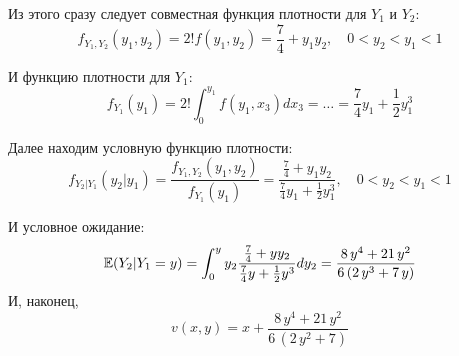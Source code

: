 \begin{enumerate}
\begin{enumerate}
Из этого сразу следует совместная функция плотности для $ Y_{1} $ и $ Y_{2} $:
\begin{equation}
f_{Y_{1},Y_{2}}(y_{1},y_{2})=2! f(y_{1},y_{2})=\frac{7}{4}+y_{1}y_{2}, \quad 0<y_{2}<y_{1}<1 
\end{equation}

И функцию плотности для $ Y_{1} $:
\begin{equation}
f_{Y_{1}}(y_{1})=2!\int_{0}^{y_{1}} f(y_{1},x_{3}) dx_{3}=\ldots=\frac{7}{4}y_{1}+\frac{1}{2}y_{1}^{3}
\end{equation}

Далее находим условную функцию плотности:
\begin{equation}
 f_{Y_{2}|Y_{1}}(y_{2}|y_{1})=\frac{f_{Y_{1},Y_{2}}(y_{1},y_{2})}{f_{Y_{1}}(y_{1})}=\frac{\frac{7}{4}+y_{1}y_{2}}{\frac{7}{4}y_{1}+\frac{1}{2}y_{1}^{3}}, \quad 0<y_{2}<y_{1}<1 
\end{equation}

И условное ожидание:
\begin{equation}
\mathbb{E}(Y_{2}|Y_{1}=y)=\int_{0}^{y} y_{2} \frac{\frac{7}{4}+yy_{2}}{\frac{7}{4}y+\frac{1}{2}y^{3}}dy_{2}=\frac{8 \, y^{4} + 21 \, y^{2}}{6 \, {\left(2 \, y^{3} + 7 \, y\right)}}
\end{equation}
И, наконец,
\begin{equation}
v(x,y)=x+\frac{8 \, y^{4} + 21 \, y^{2}}{6 \, {\left(2 \, y^{2} + 7\right)}}
\end{equation}

\end{enumerate}
\end{enumerate}



